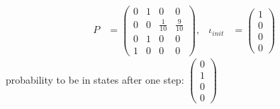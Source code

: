 \documentclass[a4paper, 10pt]{article}
\begin{document}
\begin{mdframed}
\begin{itemize}
\end{itemize}
\begin{multicols}{2}
\begin{center}
\scalebox{1}{}
\end{center}
\begin{align*}
P&=
\begin{pmatrix}
0 & 1 & 0 & 0 \\
0 & 0 & \frac{1}{10} & \frac{9}{10} \\
0 & 1 & 0 & 0 \\
1 & 0 & 0 & 0
\end{pmatrix},
&\iota_{init}&=\begin{pmatrix}1\\0\\0\\0\end{pmatrix}
\end{align*}
probability to be in states after one step: $\begin{pmatrix}
0 \\ 1 \\ 0 \\ 0
\end{pmatrix}$
\end{multicols}

\end{mdframed}

\end{document}
